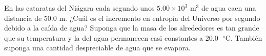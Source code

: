 \item En las cataratas del Niágara cada segundo unos $5.00 \times 10^3\text{ m}^3$ de agua caen una distancia de $50.0\text{ m}$. ¿Cuál es el incremento en entropía del Universo por segundo debido a la caída de agua? Suponga que la masa de los alrededores es tan grande que su temperatura y la del agua permanecen casi constantes a $20.0\text{ }^\circ\text{C}$. También suponga una cantidad despreciable de agua que se evapora.
